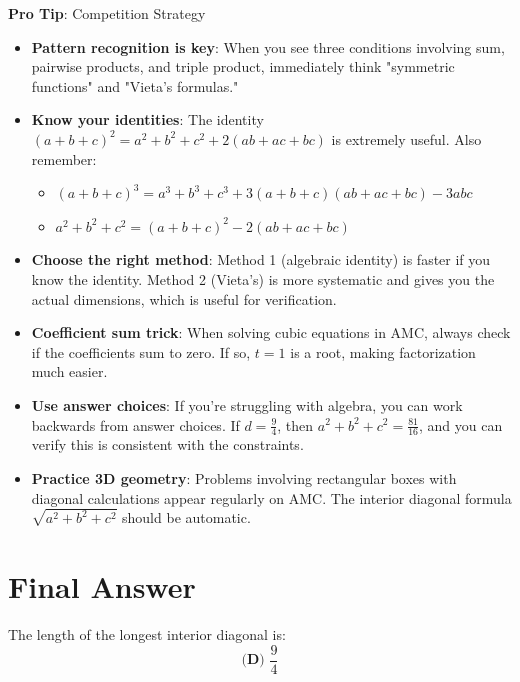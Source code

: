 \documentclass[12pt]{article}
\begin{document}
\begin{tipbox}
\textbf{Pro Tip}: Competition Strategy

\begin{itemize}
    \item \textbf{Pattern recognition is key}: When you see three conditions involving sum, pairwise products, and triple product, immediately think "symmetric functions" and "Vieta's formulas."
    
    \item \textbf{Know your identities}: The identity $(a+b+c)^2 = a^2+b^2+c^2 + 2(ab+ac+bc)$ is extremely useful. Also remember:
    \begin{itemize}
        \item $(a+b+c)^3 = a^3+b^3+c^3 + 3(a+b+c)(ab+ac+bc) - 3abc$
        \item $a^2+b^2+c^2 = (a+b+c)^2 - 2(ab+ac+bc)$
    \end{itemize}
    
    \item \textbf{Choose the right method}: Method 1 (algebraic identity) is faster if you know the identity. Method 2 (Vieta's) is more systematic and gives you the actual dimensions, which is useful for verification.
    
    \item \textbf{Coefficient sum trick}: When solving cubic equations in AMC, always check if the coefficients sum to zero. If so, $t=1$ is a root, making factorization much easier.
    
    \item \textbf{Use answer choices}: If you're struggling with algebra, you can work backwards from answer choices. If $d = \frac{9}{4}$, then $a^2+b^2+c^2 = \frac{81}{16}$, and you can verify this is consistent with the constraints.
    
    \item \textbf{Practice 3D geometry}: Problems involving rectangular boxes with diagonal calculations appear regularly on AMC. The interior diagonal formula $\sqrt{a^2+b^2+c^2}$ should be automatic.
\end{itemize}
\end{tipbox}

\section*{Final Answer}

The length of the longest interior diagonal is:
$$\boxed{\textbf{(D) } \frac{9}{4}}$$
\end{document}
